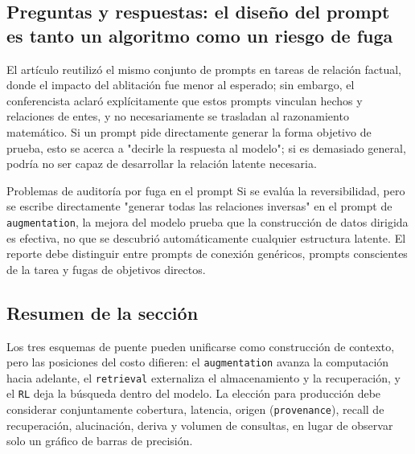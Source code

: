 \subsection{Preguntas y respuestas: el diseño del prompt es tanto un algoritmo como un riesgo de fuga}

El artículo reutilizó el mismo conjunto de prompts en tareas de relación factual, donde el impacto del ablitación fue menor al esperado; sin embargo, el conferencista aclaró explícitamente que estos prompts vinculan hechos y relaciones de entes, y no necesariamente se trasladan al razonamiento matemático. Si un prompt pide directamente generar la forma objetivo de prueba, esto se acerca a "decirle la respuesta al modelo"; si es demasiado general, podría no ser capaz de desarrollar la relación latente necesaria.


\begin{warningbox}{Problemas de auditoría por fuga en el prompt}
Si se evalúa la reversibilidad, pero se escribe directamente "generar todas las relaciones inversas" en el prompt de \texttt{augmentation}, la mejora del modelo prueba que la construcción de datos dirigida es efectiva, no que se descubrió automáticamente cualquier estructura latente. El reporte debe distinguir entre prompts de conexión genéricos, prompts conscientes de la tarea y fugas de objetivos directos.
\end{warningbox}

\subsection{Resumen de la sección}

Los tres esquemas de puente pueden unificarse como construcción de contexto, pero las posiciones del costo difieren: el \texttt{augmentation} avanza la computación hacia adelante, el \texttt{retrieval} externaliza el almacenamiento y la recuperación, y el \texttt{RL} deja la búsqueda dentro del modelo. La elección para producción debe considerar conjuntamente cobertura, latencia, origen (\texttt{provenance}), recall de recuperación, alucinación, deriva y volumen de consultas, en lugar de observar solo un gráfico de barras de precisión.

